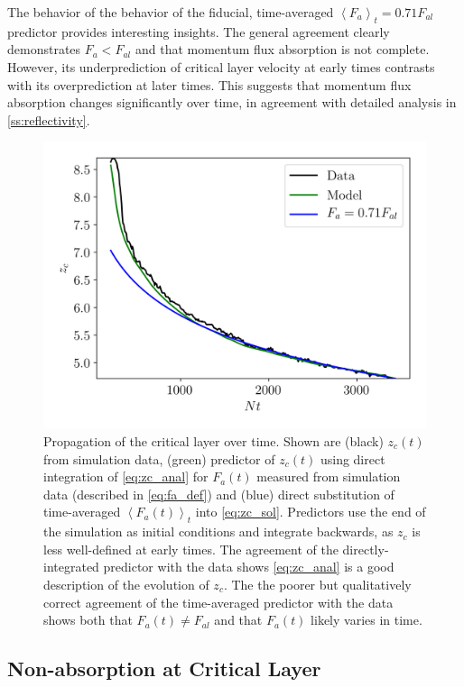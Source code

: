 \documentclass[
        fleqn,
        usenatbib,
        referee,
    ]{mnras}
\newcommand*{\ev}[1]{\left\langle#1\right\rangle}
\begin{document}
The behavior of the behavior of the fiducial, time-averaged $\ev{F_a}_t =
0.71F_{al}$ predictor provides interesting insights. The general agreement
clearly demonstrates $F_a < F_{al}$ and that momentum flux absorption is
not complete. However, its underprediction of critical layer velocity at early
times contrasts with its overprediction at later times. This suggests that
momentum flux absorption changes significantly over time, in agreement with
detailed analysis in \autoref{ss:reflectivity}.
\begin{figure}
    \centering
    \includegraphics[width=\columnwidth]{plots/nl_front.png}
    \caption{Propagation of the critical layer over time. Shown are (black)
    $z_c(t)$ from simulation data, (green) predictor of $z_c(t)$ using direct
    integration of \autoref{eq:zc_anal} for $F_a(t)$ measured from
    simulation data (described in \autoref{eq:fa_def}) and (blue) direct
    substitution of time-averaged $\ev{F_a(t)}_t$ into
    \autoref{eq:zc_sol}. Predictors use the end of the simulation as initial
    conditions and integrate backwards, as $z_c$ is less well-defined at early
    times. The agreement of the directly-integrated predictor with the data
    shows \autoref{eq:zc_anal} is a good description of the evolution of $z_c$.
    The the poorer but qualitatively correct agreement of the time-averaged
    predictor with the data shows both that $F_a(t) \neq F_{al}$ and that
    $F_a(t)$ likely varies in time.}\label{fig:nl_front}
\end{figure}

\subsection{Non-absorption at Critical Layer}\label{ss:reflectivity}
\end{document}
